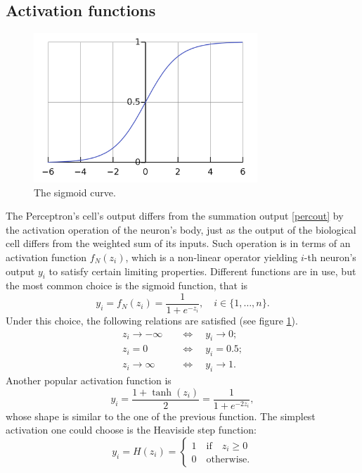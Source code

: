 \documentclass[%
    corpo=11pt,
    twoside,
    stile=classica,
    oldstyle,
    autoretitolo,
    tipotesi=magistrale,
    greek,
    evenboxes,
    english
]{toptesi}
\begin{document}
\subsection{Activation functions}
\label{percact}
\begin{figure}[h]
\centering
\includegraphics[width=0.75\textwidth]{pictures/sigmoid.png}
\caption{The sigmoid curve.}
\label{fig:sigmoid}
\end{figure}
The Perceptron's cell's output differs from the summation output \ref{percout} by the activation operation of the neuron's body, just as the output of the biological cell differs from the weighted sum of its inputs. Such operation is in terms of an activation function $f_N(z_i)$, which is a non-linear operator yielding $i$-th neuron's output $y_i$ to satisfy certain limiting properties. Different functions are in use, but the most common choice is the sigmoid function, that is
\begin{equation}
\label{act-sigmoid}
y_i = f_N(z_i) = \frac{1}{1 + e^{-z_i}}, \quad i \in \{1,\dots,n\}.
\end{equation}
Under this choice, the following relations are satisfied (see figure \ref{fig:sigmoid}).
\begin{align*}
z_i \to - \infty \quad &\Longleftrightarrow \quad y_i \to 0 ;\\
z_i = 0 \quad &\Longleftrightarrow \quad y_i = 0.5; \\
z_i \to  \infty \quad &\Longleftrightarrow \quad y_i \to 1.
\end{align*}
Another popular activation function is
\begin{equation}
\label{act-tanh}
y_i = \frac{1 + \tanh(z_i)}{2} = \frac{1}{1 + e^{-2z_i}},
\end{equation}
whose shape is similar to the one of the previous function. The simplest activation one could choose is the Heaviside step function:
\begin{equation*}
y_i = H(z_i) = \begin{cases}
1 \quad \text{if} \quad z_i \geq 0 \\
0 \quad \text{otherwise.}
\end{cases}
\end{equation*}
\end{document}
